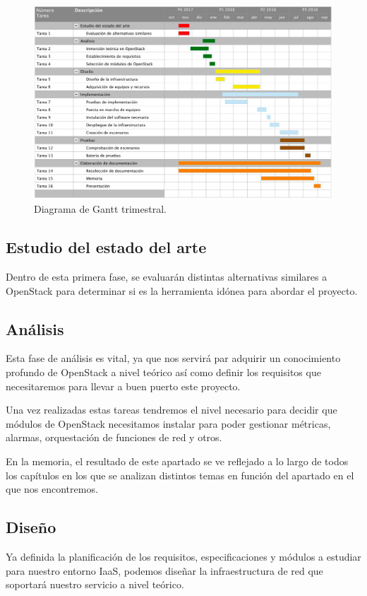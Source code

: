 \begin{figure}
    \centering
    \includegraphics[width=1\textwidth]{imagenes/capitulo3/gantt-trimestral.jpg}
    \caption{Diagrama de Gantt trimestral.}
	\vspace{0.3cm}
    \label{fig:gantTrimes}
\end{figure}


\subsection{Estudio del estado del arte}
Dentro de esta primera fase, se evaluarán distintas alternativas similares a OpenStack para determinar si es la herramienta idónea para abordar el proyecto.

\subsection{Análisis}
Esta fase de análisis es vital, ya que nos servirá par adquirir un conocimiento profundo de OpenStack a nivel teórico así como definir los requisitos que necesitaremos para llevar a buen puerto este proyecto.

Una vez realizadas estas tareas tendremos el nivel necesario para decidir que módulos de OpenStack necesitamos instalar para poder gestionar métricas, alarmas, orquestación de funciones de red y otros.

En la memoria, el resultado de este apartado se ve reflejado a lo largo de todos los capítulos en los que se analizan distintos temas en función del apartado en el que nos encontremos.

\subsection{Diseño}
Ya definida la planificación de los requisitos, especificaciones y  módulos a estudiar para nuestro entorno IaaS, podemos diseñar la infraestructura de red que soportará nuestro servicio a nivel teórico.

